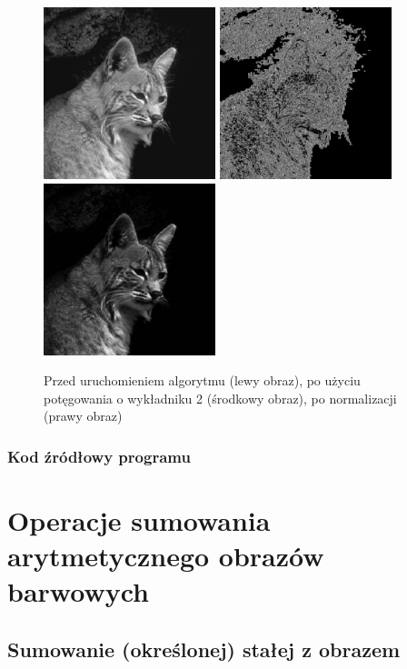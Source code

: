 \documentclass[a4paper,12pt]{book}
\begin{document}
\begin{figure}[H]
\caption{Przed uruchomieniem algorytmu (lewy obraz), po użyciu potęgowania o wykładniku 2 (środkowy obraz), po normalizacji (prawy obraz)}
\includegraphics[width=5cm, height=5cm]{cat-unmodified.jpg}
\includegraphics[width=5cm, height=5cm]{2-4/power-gray-cat-20.png}
\includegraphics[width=5cm, height=5cm]{2-4/power-gray-cat-20-norm.png}
\end{figure}

\subsection*{Kod źródłowy programu}

\chapter{Operacje sumowania arytmetycznego obrazów barwowych}
\section{Sumowanie (określonej) stałej z obrazem}
\end{document}
